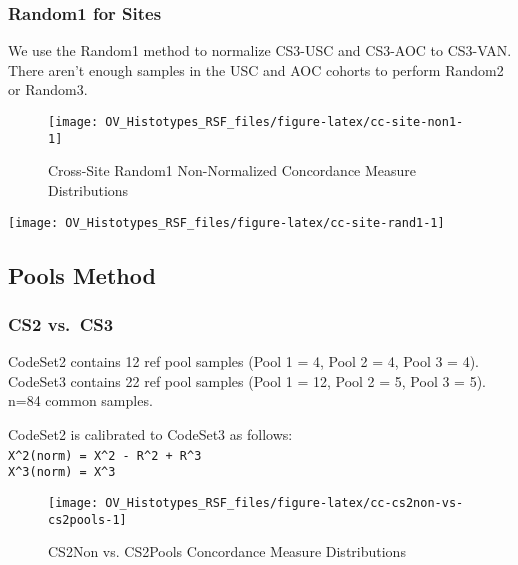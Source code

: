 \documentclass[
]{report}
\begin{document}
\hypertarget{random1-for-sites}{%
\subsubsection{Random1 for Sites}\label{random1-for-sites}}

We use the Random1 method to normalize CS3-USC and CS3-AOC to CS3-VAN. There aren't enough samples in the USC and AOC cohorts to perform Random2 or Random3.

\begin{figure}[H]

{\centering \texttt{[image: OV\_Histotypes\_RSF\_files/figure-latex/cc-site-non1-1]} 

}

\caption{Cross-Site Random1 Non-Normalized Concordance Measure Distributions}\label{fig:cc-site-non1}
\end{figure}

\begin{center}\texttt{[image: OV\_Histotypes\_RSF\_files/figure-latex/cc-site-rand1-1]} \end{center}

\hypertarget{pools-method-1}{%
\subsection{Pools Method}\label{pools-method-1}}

\hypertarget{cs2-vs.-cs3}{%
\subsubsection{CS2 vs.~CS3}\label{cs2-vs.-cs3}}

CodeSet2 contains 12 ref pool samples (Pool 1 = 4, Pool 2 = 4, Pool 3 = 4). CodeSet3 contains 22 ref pool samples (Pool 1 = 12, Pool 2 = 5, Pool 3 = 5). n=84 common samples.

CodeSet2 is calibrated to CodeSet3 as follows:\\
\texttt{X\^{}2(norm)\ =\ X\^{}2\ -\ R\^{}2\ +\ R\^{}3}~\\
\texttt{X\^{}3(norm)\ =\ X\^{}3}

\begin{figure}[H]

{\centering \texttt{[image: OV\_Histotypes\_RSF\_files/figure-latex/cc-cs2non-vs-cs2pools-1]} 

}

\caption{CS2Non vs. CS2Pools Concordance Measure Distributions}\label{fig:cc-cs2non-vs-cs2pools}
\end{figure}
\end{document}
